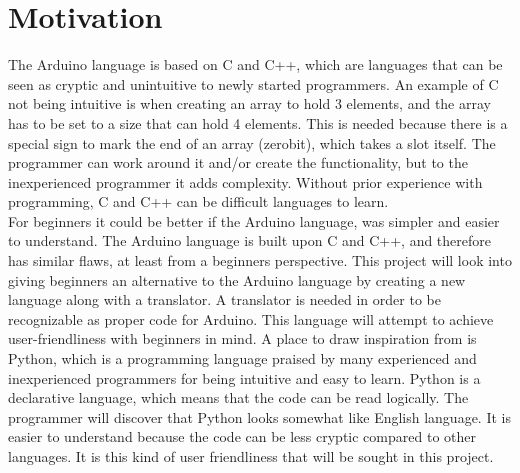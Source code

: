 \section{Motivation}\label{introduction:motivation}
The Arduino language is based on C and C++, which are languages that can be seen as cryptic and unintuitive to newly started programmers. An example of C not being intuitive is when creating an array to hold 3 elements, and the array has to be set to a size that can hold 4 elements. This is needed because there is a special sign to mark the end of an array (zerobit), which takes a slot itself. The programmer can work around it and/or create the functionality, but to the inexperienced programmer it adds complexity. Without prior experience with programming, C and C++ can be difficult languages to learn. \\
For beginners it could be better if the Arduino language, was simpler and easier to understand. The Arduino language is built upon C and C++, and therefore has similar flaws, at least from a beginners perspective. This project will look into giving beginners an alternative to the Arduino language by creating a new language along with a translator. A translator is needed in order to be recognizable as proper code for Arduino. This language will attempt to achieve user-friendliness with beginners in mind. A place to draw inspiration from is Python, which is a programming language praised by many experienced and inexperienced programmers for being intuitive and easy to learn. \cite{python:about} Python is a declarative language, which means that the code can be read logically. The programmer will discover that Python looks somewhat like English language. It is easier to understand because the code can be less cryptic compared to other languages. It is this kind of user friendliness that will be sought in this project.